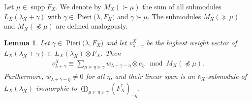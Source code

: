 \documentclass[11pt,fleqn]{amsart}
\newtheorem{lem}[thm]{Lemma}
\theoremstyle{definition}
\theoremstyle{remark}
\theoremstyle{remark}
\newcommand\lie[1]{\mathfrak{#1}}
\DeclareMathOperator\supp{supp}
\newcommand\Pieri[2]{\operatorname{Pieri}{(#1},{#2)}}
\begin{document}
Let $\mu \in \supp F_X$. We denote by $M_X(\succ \mu)$ the sum of all 
submodules $L_X(\lambda_X + \gamma)$ with $\gamma \in \Pieri{\lambda}{F_X}$ and 
$\gamma \succ \mu$. The submodules $M_X(\succeq \mu)$ and $M_X(\npreceq \mu)$ 
are defined analogously.  
\begin{lem}
\label{lem:hw-support}
Let $\gamma \in \Pieri{\lambda}{F_X}$ and let $v_{\lambda + \gamma}^X$ 
be the highest weight vector of $L_X(\lambda_X +\gamma) \subset L_X(\lambda_X) 
\otimes F_X$. Then 
  \begin{align*}
      v_{\lambda +\gamma}^X \equiv \sum_{\mu \succeq \eta \succeq \gamma}
      w_{\lambda + \gamma - \eta} \otimes e_{\eta}
      \mod M_X(\npreceq \mu).
  \end{align*}
Furthermore, $w_{\lambda + \gamma - \eta} \neq 0$ for all $\eta$, and their 
linear span is an $\lie n_X$-submodule of $L_X(\lambda_X)$ isomorphic to 
$\bigoplus_{\mu \succeq \eta \succeq \gamma} (F_X^*)_{-\eta}$.
\end{lem}
\end{document}
